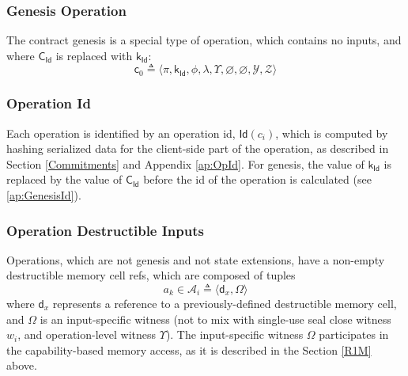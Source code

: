 \documentclass[9pt,oneside]{amsart}
\begin{document}
\begin{multicols}{2}
\subsubsection{Genesis Operation}

The contract \gls{genesis} is a special type of operation, which contains no inputs,
and where $\mathsf{C_{Id}}$ is replaced with $\mathsf{k_{Id}}$:
\noindent
\begin{equation}
\mathsf{c}_0 \triangleq \langle \pi, \mathsf{k_{Id}}, \phi, \lambda, \Upsilon, \varnothing, \varnothing, \mathcal{Y}, \mathcal{Z} \rangle
\end{equation}

\subsubsection{Operation Id}

Each operation is identified by an operation id, $\mathsf{Id}(c_i)$, which is computed by
hashing serialized data for the client-side part of the operation,
as described in Section \ref{Commitments} and Appendix \ref{ap:OpId}.
For genesis, the value of $\mathsf{k_{Id}}$
is replaced by the value of $\mathsf{C_{Id}}$ before the id of the operation is calculated
(see \ref{ap:GenesisId}).

\subsubsection{Operation Destructible Inputs}\label{Input}

Operations, which are not \gls{genesis} and not \glspl{state extension},
have a non-empty destructible memory cell refs, which are composed of tuples
\noindent
\begin{equation}\label{eq:input}
a_k \in \mathcal{A}_i \triangleq \langle \mathsf{d}_x, \Omega \rangle
\end{equation}
\noindent
where $\mathsf{d}_x$ represents a reference to a previously-defined destructible memory cell,
and $\Omega$ is an \gls{input-specific witness}
(not to mix with single-use \gls{seal close witness} $w_i$,
and \gls{operation-level witness} $\Upsilon$).
The \gls{input-specific witness} $\Omega$ participates in the capability-based memory access,
as it is described in the Section \ref{R1M} above.

\end{multicols}
\end{document}
